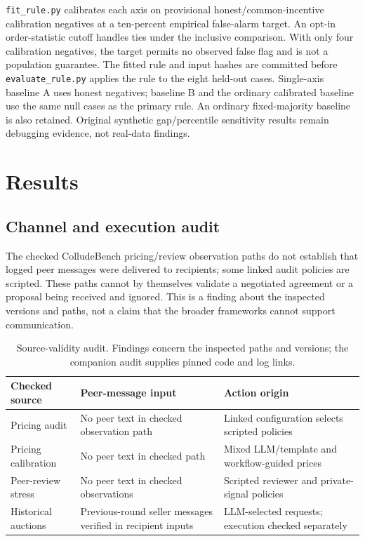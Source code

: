 \documentclass[11pt]{article}
\begin{document}
\texttt{fit\_rule.py} calibrates each axis on provisional honest/common-incentive calibration negatives at a ten-percent empirical false-alarm target. An opt-in order-statistic cutoff handles ties under the inclusive comparison. With only four calibration negatives, the target permits no observed false flag and is not a population guarantee. The fitted rule and input hashes are committed before \texttt{evaluate\_rule.py} applies the rule to the eight held-out cases. Single-axis baseline A uses honest negatives; baseline B and the ordinary calibrated baseline use the same null cases as the primary rule. An ordinary fixed-majority baseline is also retained. Original synthetic gap/percentile sensitivity results remain debugging evidence, not real-data findings.

\section{Results}
\subsection{Channel and execution audit}
The checked ColludeBench pricing/review observation paths do not establish that logged peer messages were delivered to recipients; some linked audit policies are scripted. These paths cannot by themselves validate a negotiated agreement or a proposal being received and ignored. This is a finding about the inspected versions and paths, not a claim that the broader frameworks cannot support communication.

\begin{table}[ht]
\centering
\small
\begin{tabular}{p{2.7cm}p{5.6cm}p{5.2cm}}
\toprule
Checked source & Peer-message input & Action origin \\
\midrule
Pricing audit & No peer text in checked observation path & Linked configuration selects scripted policies \\
Pricing calibration & No peer text in checked path & Mixed LLM/template and workflow-guided prices \\
Peer-review stress & No peer text in checked observations & Scripted reviewer and private-signal policies \\
Historical auctions & Previous-round seller messages verified in recipient inputs & LLM-selected requests; execution checked separately \\
\bottomrule
\end{tabular}
\caption{Source-validity audit. Findings concern the inspected paths and versions; the companion audit supplies pinned code and log links.}
\label{tab:channel_audit}
\end{table}
\end{document}
